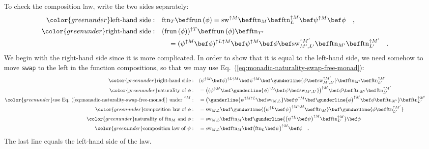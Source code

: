 To check the composition law, write the two sides separately:
\begin{align*}
{\color{greenunder}\text{left-hand side}:}\quad & \text{ftn}_{T}\bef\text{frun}\,(\phi)=\text{sw}^{\uparrow M}\bef\text{ftn}_{M}\bef\text{ftn}_{L}^{\uparrow M}\bef\psi^{\uparrow M}\bef\phi\quad,\\
{\color{greenunder}\text{right-hand side}:}\quad & (\text{frun}\,(\phi))^{\uparrow T}\bef\text{frun}\,(\phi)\bef\text{ftn}_{T^{\prime}}\\
 & \quad=(\psi^{\uparrow M}\bef\phi)^{\uparrow L\uparrow M}\bef\psi^{\uparrow M}\bef\phi\bef\text{sw}_{M^{\prime},L^{\prime}}^{\uparrow M^{\prime}}\bef\text{ftn}_{M^{\prime}}\bef\text{ftn}_{L^{\prime}}^{\uparrow M^{\prime}}\quad.
\end{align*}
We begin with the right-hand side since it is more complicated. In
order to show that it is equal to the left-hand side, we need somehow
to move \lstinline!swap! to the left in the function compositions,
so that we may use Eq.~(\ref{eq:monadic-naturality-swap-free-monad}):
\begin{align*}
{\color{greenunder}\text{right-hand side}:}\quad & (\psi^{\uparrow M}\bef\phi)^{\uparrow L\uparrow M}\bef\psi^{\uparrow M}\bef\gunderline{\phi\bef\text{sw}_{M^{\prime},L^{\prime}}^{\uparrow M^{\prime}}}\bef\text{ftn}_{M^{\prime}}\bef\text{ftn}_{L^{\prime}}^{\uparrow M^{\prime}}\\
{\color{greenunder}\text{naturality of }\phi:}\quad & =\big((\psi^{\uparrow M}\bef\gunderline{\phi)^{\uparrow L}\bef\psi\bef\text{sw}_{M^{\prime},L^{\prime}}}\big)^{\uparrow M}\bef\phi\bef\text{ftn}_{M^{\prime}}\bef\text{ftn}_{L^{\prime}}^{\uparrow M^{\prime}}\\
{\color{greenunder}\text{use Eq.~(\ref{eq:monadic-naturality-swap-free-monad}) under }^{\uparrow M}:}\quad & =\big(\gunderline{\psi^{\uparrow M\uparrow L}\bef\text{sw}_{M,L}}\bef\psi^{\uparrow M}\bef\gunderline{\phi\big)^{\uparrow M}\bef\phi\bef\text{ftn}_{M^{\prime}}}\bef\text{ftn}_{L^{\prime}}^{\uparrow M^{\prime}}\\
{\color{greenunder}\text{composition law of }\phi:}\quad & =\text{sw}_{M,L}\bef\gunderline{\big(\psi^{\uparrow L}\bef\psi\big)^{\uparrow M\uparrow M}\bef\text{ftn}_{M}}\bef\gunderline{\phi\bef\text{ftn}_{L^{\prime}}^{\uparrow M^{\prime}}}\\
{\color{greenunder}\text{naturality of }\text{ftn}_{M}\text{ and }\phi:}\quad & =\text{sw}_{M,L}\bef\text{ftn}_{M}\bef\gunderline{\big(\psi^{\uparrow L}\bef\psi\big)^{\uparrow M}\bef\text{ftn}_{L^{\prime}}^{\uparrow M}}\bef\phi\\
{\color{greenunder}\text{composition law of }\psi:}\quad & =\text{sw}_{M,L}\bef\text{ftn}_{M}\bef\big(\text{ftn}_{L}\bef\psi\big)^{\uparrow M}\bef\phi\quad.
\end{align*}
The last line equals the left-hand side of the law.

